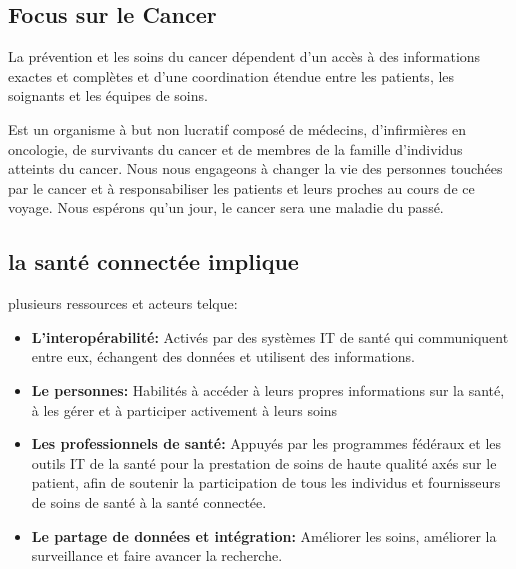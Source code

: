 \documentclass[12pt]{article}
\begin{document}
\subsection{Focus sur le Cancer}
La prévention et les soins du cancer dépendent d'un accès à des informations exactes et complètes et d'une coordination étendue entre les patients, les soignants et les équipes de soins.

Est un organisme à but non lucratif composé de médecins, d'infirmières en oncologie, de survivants du cancer et de membres de la famille d'individus atteints du cancer. Nous nous engageons à changer la vie des personnes touchées par le cancer et à responsabiliser les patients et leurs proches au cours de ce voyage. Nous espérons qu'un jour, le cancer sera une maladie du passé.

\subsection{la santé connectée implique} 
plusieurs ressources et acteurs telque:
\begin{itemize}
	\item \textbf{L’interopérabilité:} Activés par des systèmes IT de santé qui communiquent entre eux, échangent des données et utilisent des informations.
	\item \textbf{Le personnes:} Habilités à accéder à leurs propres informations sur la santé, à les gérer et à participer activement à leurs soins
	\item \textbf{Les professionnels de santé:} Appuyés par les programmes fédéraux et les outils IT de la santé pour la prestation de soins de haute qualité axés sur le patient, afin de soutenir la participation de tous les individus et fournisseurs de soins de santé à la santé connectée.
	\item \textbf{Le partage de données et intégration:} Améliorer les soins, améliorer la surveillance et faire avancer la recherche.
\end{itemize}
\end{document}
